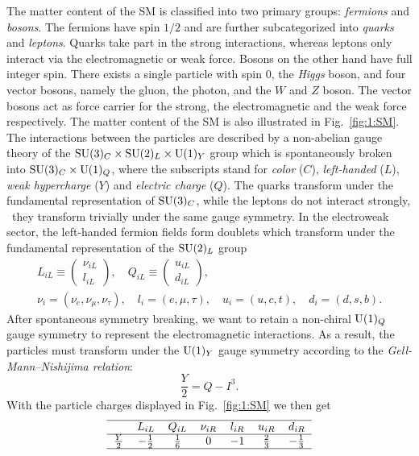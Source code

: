 The matter content of the \acs{SM} is classified into two primary groups: \textit{fermions} and \textit{bosons}. The fermions have spin $1/2$ and are further subcategorized into \textit{quarks} and \textit{leptons}. Quarks take part in the strong interactions, whereas leptons only interact via the electromagnetic or weak force. Bosons on the other hand have full integer spin. There exists a single particle with spin 0, the \textit{Higgs} boson, and four vector bosons, namely the gluon, the photon, and the $W$ and $Z$ boson. The vector bosons act as force carrier for the strong, the electromagnetic and the weak force respectively. The matter content of the \acs{SM} is also illustrated in Fig.~\ref{fig:1:SM}. The interactions between the particles are described by a non-abelian gauge theory of the $\mathrm{SU}(3)_C \times \mathrm{SU}(2)_L \times \mathrm{U}(1)_Y$ group which is spontaneously broken into $\mathrm{SU}(3)_C \times \mathrm{U}(1)_Q$, where the subscripts stand for \textit{color} ($C$), \textit{left-handed} ($L$), \textit{weak hypercharge} ($Y$) and \textit{electric charge} ($Q$). The quarks transform under the fundamental representation of $\mathrm{SU}(3)_C$, while the leptons do not interact strongly, \ie~they transform trivially under the same gauge symmetry. In the electroweak sector, the left-handed fermion fields form doublets which transform under the fundamental representation of the $\mathrm{SU}(2)_L$ group
\begin{equation}
\begin{gathered}
L_{iL} \equiv \begin{pmatrix}
\nu_{iL} \\
l_{iL}
\end{pmatrix}, \quad Q_{iL} \equiv \begin{pmatrix}
u_{iL} \\
d_{iL}
\end{pmatrix}, \\
\nu_i = \left( \nu_e, \nu_\mu, \nu_\tau \right),\quad  l_i = \left( e, \mu, \tau \right),\quad u_i = \left(u, c, t \right),\quad d_i = \left(d, s, b \right).
\end{gathered}
\end{equation}
After spontaneous symmetry breaking, we want to retain a non-chiral $\mathrm{U}(1)_Q$ gauge symmetry to represent the electromagnetic interactions. As a result, the particles must transform under the $\mathrm{U}(1)_Y$ gauge symmetry according to the \textit{Gell-Mann--Nishijima relation}:
\begin{equation}
\frac{Y}{2} = Q - I^3.
\end{equation}
With the particle charges displayed in Fig.~\ref{fig:1:SM} we then get
\begin{equation*}
\begin{tabular}{ccccccc}
  \hline
                & $L_{iL}$ & $Q_{iL}$ & $\nu_{iR}$ & $l_{iR}$ & $u_{iR}$ & $d_{iR}$ \\ \hline
  $\frac{Y}{2}$ & $-\frac{1}{2}$ & $\frac{1}{6}$ & $0$ & $-1$ & $\frac{2}{3}$ & $-\frac{1}{3}$ \\ \hline
\end{tabular}
\end{equation*}

